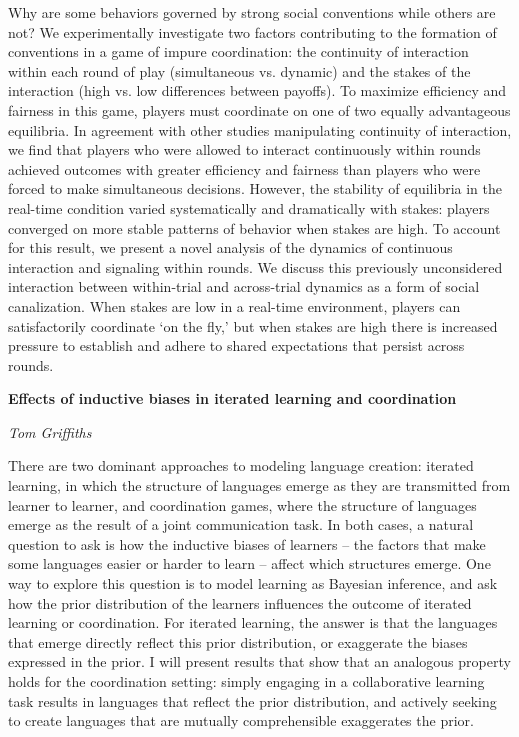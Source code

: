 \documentclass[10pt,letterpaper]{article}
\begin{document}
Why are some behaviors governed by strong social conventions while others are not? We experimentally investigate two factors contributing to the formation of conventions in a game of impure coordination: the continuity of interaction within each round of play (simultaneous vs. dynamic) and the stakes of the interaction (high vs. low differences between payoffs). To maximize efficiency and fairness in this game, players must coordinate on one of two equally advantageous equilibria. In agreement with other studies manipulating continuity of interaction, we find that players who were allowed to interact continuously within rounds achieved outcomes with greater efficiency and fairness than players who were forced to make simultaneous decisions. However, the stability of equilibria in the real-time condition varied systematically and dramatically with stakes: players converged on more stable patterns of behavior when stakes are high. To account for this result, we present a novel analysis of the dynamics of continuous interaction and signaling within rounds. We discuss this previously unconsidered interaction between within-trial and across-trial dynamics as a form of social canalization. When stakes are low in a real-time environment, players can satisfactorily coordinate `on the fly,' but when stakes are high there is increased pressure to establish and adhere to shared expectations that persist across rounds.

\begin{center}\textbf{Effects of inductive biases in iterated learning and coordination}\end{center}
\begin{center}\emph{Tom Griffiths}\end{center}

There are two dominant approaches to modeling language creation: iterated learning, in which the structure of languages emerge as they are transmitted from learner to learner, and coordination games, where the structure of languages emerge as the result of a joint communication task. In both cases, a natural question to ask is how the inductive biases of learners -- the factors that make some languages easier or harder to learn -- affect which structures emerge. One way to explore this question is to model learning as Bayesian inference, and ask how the prior distribution of the learners influences the outcome of iterated learning or coordination. For iterated learning, the answer is that the languages that emerge directly reflect this prior distribution, or exaggerate the biases expressed in the prior. I will present results that show that an analogous property holds for the coordination setting: simply engaging in a collaborative learning task results in languages that reflect the prior distribution, and actively seeking to create languages that are mutually comprehensible exaggerates the prior.



\setlength{\bibleftmargin}{.125in}
\setlength{\bibindent}{-\bibleftmargin}


\end{document}
